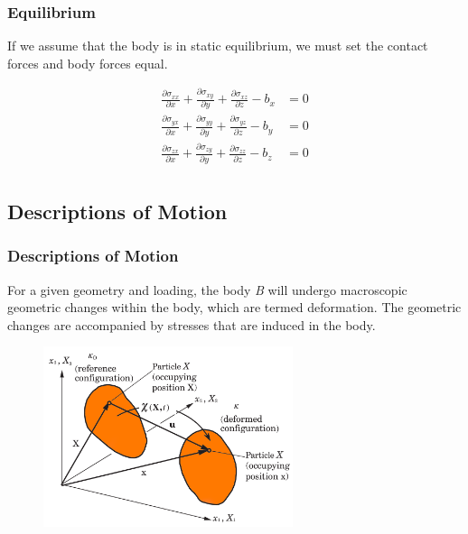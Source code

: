 \documentclass[notes]{beamer}
\begin{document}
\begin{frame}
	\frametitle{Equilibrium}
	
	If we assume that the body is in static equilibrium, we must set the contact forces and body forces equal. 
	
	\begin{align*}
		\frac{\partial \sigma_{xx}}{\partial x} +%
		\frac{\partial \sigma_{xy}}{\partial y} +%
		\frac{\partial \sigma_{xz}}{\partial z} - b_x &= 0 \\
		\frac{\partial \sigma_{yx}}{\partial x} +%
		\frac{\partial \sigma_{yy}}{\partial y} +%
		\frac{\partial \sigma_{yz}}{\partial z} - b_y &= 0\\
		\frac{\partial \sigma_{zx}}{\partial x} +%
		\frac{\partial \sigma_{zy}}{\partial y} +%
		\frac{\partial \sigma_{zz}}{\partial z} - b_z &= 0 \\
	\end{align*}
\end{frame}


\subsection{Descriptions of Motion}
\begin{frame}
\frametitle{Descriptions of Motion}

For a given geometry and loading, the body \textit{B} will undergo macroscopic geometric
changes within the body, which are termed deformation. The geometric changes are
accompanied by stresses that are induced in the body.

\begin{figure}
	\includegraphics[width=0.65\textwidth]{figs/deformation-body.png}
\end{figure}
\end{frame}
\end{document}

